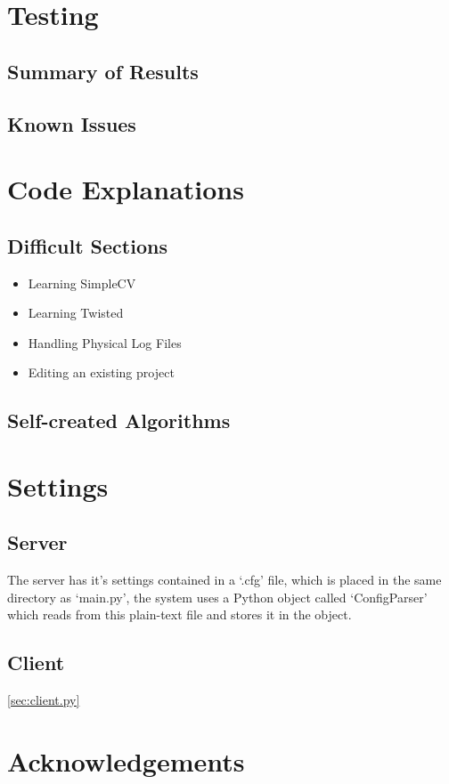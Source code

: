 \documentclass[a4paper]{article}
\begin{document}
\section{Testing}
\subsection{Summary of Results}
\subsection{Known Issues}
\section{Code Explanations}
\subsection{Difficult Sections}
\begin{itemize}
    \item Learning SimpleCV
    \item Learning Twisted
    \item Handling Physical Log Files
    \item Editing an existing project
\end{itemize}
\subsection{Self-created Algorithms}
\section{Settings}
\subsection{Server}
The server has it's settings contained in a `.cfg' file, which is placed in the same directory as `main.py',
the system uses a Python object called `ConfigParser' which reads from this plain-text file and stores it in
the object.


\subsection{Client}
\ref{sec:client.py}
%
\section{Acknowledgements}
\end{document}
